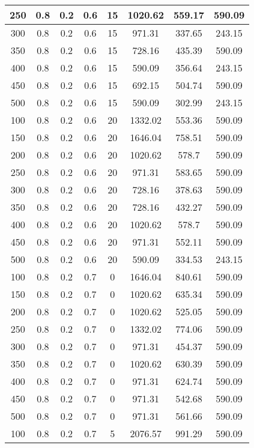 \documentclass[a4paper, 12pt]{extreport}
\begin{document}
\begin{itemize}
\begin{longtable}{|c|c|c|c|c|c|c|c|}
			250 & 0.8 & 0.2 & 0.6 & 15 & 1020.62 & 559.17 & 590.09 \\\hline
			300 & 0.8 & 0.2 & 0.6 & 15 & 971.31 & 337.65 & 243.15 \\\hline
			350 & 0.8 & 0.2 & 0.6 & 15 & 728.16 & 435.39 & 590.09 \\\hline
			400 & 0.8 & 0.2 & 0.6 & 15 & 590.09 & 356.64 & 243.15 \\\hline
			450 & 0.8 & 0.2 & 0.6 & 15 & 692.15 & 504.74 & 590.09 \\\hline
			500 & 0.8 & 0.2 & 0.6 & 15 & 590.09 & 302.99 & 243.15 \\\hline
			100 & 0.8 & 0.2 & 0.6 & 20 & 1332.02 & 553.36 & 590.09 \\\hline
			150 & 0.8 & 0.2 & 0.6 & 20 & 1646.04 & 758.51 & 590.09 \\\hline
			200 & 0.8 & 0.2 & 0.6 & 20 & 1020.62 & 578.7 & 590.09 \\\hline
			250 & 0.8 & 0.2 & 0.6 & 20 & 971.31 & 583.65 & 590.09 \\\hline
			300 & 0.8 & 0.2 & 0.6 & 20 & 728.16 & 378.63 & 590.09 \\\hline
			350 & 0.8 & 0.2 & 0.6 & 20 & 728.16 & 432.27 & 590.09 \\\hline
			400 & 0.8 & 0.2 & 0.6 & 20 & 1020.62 & 578.7 & 590.09 \\\hline
			450 & 0.8 & 0.2 & 0.6 & 20 & 971.31 & 552.11 & 590.09 \\\hline
			500 & 0.8 & 0.2 & 0.6 & 20 & 590.09 & 334.53 & 243.15 \\\hline
			100 & 0.8 & 0.2 & 0.7 & 0 & 1646.04 & 840.61 & 590.09 \\\hline
			150 & 0.8 & 0.2 & 0.7 & 0 & 1020.62 & 635.34 & 590.09 \\\hline
			200 & 0.8 & 0.2 & 0.7 & 0 & 1020.62 & 525.05 & 590.09 \\\hline
			250 & 0.8 & 0.2 & 0.7 & 0 & 1332.02 & 774.06 & 590.09 \\\hline
			300 & 0.8 & 0.2 & 0.7 & 0 & 971.31 & 454.37 & 590.09 \\\hline
			350 & 0.8 & 0.2 & 0.7 & 0 & 1020.62 & 630.39 & 590.09 \\\hline
			400 & 0.8 & 0.2 & 0.7 & 0 & 971.31 & 624.74 & 590.09 \\\hline
			450 & 0.8 & 0.2 & 0.7 & 0 & 971.31 & 542.68 & 590.09 \\\hline
			500 & 0.8 & 0.2 & 0.7 & 0 & 971.31 & 561.66 & 590.09 \\\hline
			100 & 0.8 & 0.2 & 0.7 & 5 & 2076.57 & 991.29 & 590.09 \\\hline

\end{longtable}
\end{itemize}
\end{document}
